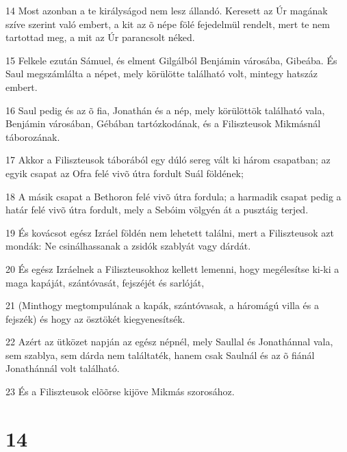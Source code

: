 \par 14 Most azonban a te királyságod nem lesz állandó. Keresett az Úr magának szíve szerint való embert, a kit az õ népe fölé fejedelmül rendelt, mert te nem tartottad meg, a mit az Úr parancsolt néked.
\par 15 Felkele ezután Sámuel, és elment Gilgálból Benjámin városába, Gibeába. És Saul megszámlálta a népet, mely körülötte található volt, mintegy hatszáz embert.
\par 16 Saul pedig és az õ fia, Jonathán és a nép, mely körülöttök található vala, Benjámin városában, Gébában tartózkodának, és a Filiszteusok Mikmásnál táborozának.
\par 17 Akkor a Filiszteusok táborából egy dúló sereg vált ki három csapatban; az egyik csapat az Ofra felé vivõ útra fordult Suál földének;
\par 18 A másik csapat a Bethoron felé vivõ útra fordula; a harmadik csapat pedig a határ felé vivõ útra fordult, mely a Sebóim völgyén át a pusztáig terjed.
\par 19 És kovácsot egész Izráel földén nem lehetett találni, mert a Filiszteusok azt mondák: Ne csinálhassanak a zsidók szablyát vagy dárdát.
\par 20 És egész Izráelnek a Filiszteusokhoz kellett lemenni, hogy megélesítse ki-ki a maga kapáját, szántóvasát, fejszéjét és sarlóját,
\par 21 (Minthogy megtompulának a kapák, szántóvasak, a háromágú villa és a fejszék) és hogy az ösztökét kiegyenesítsék.
\par 22 Azért az ütközet napján az egész népnél, mely Saullal és Jonathánnal vala, sem szablya, sem dárda nem találtaték, hanem csak Saulnál és az õ fiánál Jonathánnál volt található.
\par 23 És a Filiszteusok elõõrse kijöve Mikmás szorosához.

\chapter{14}

